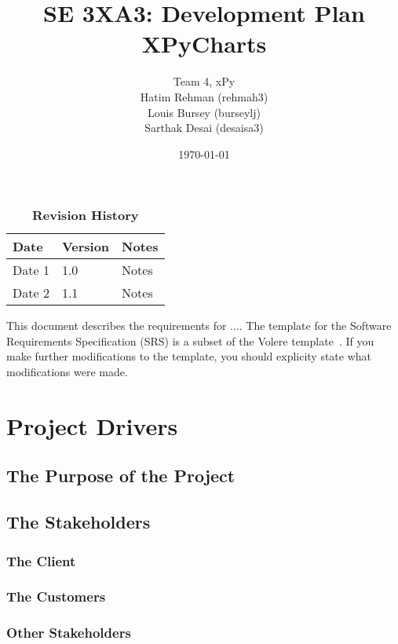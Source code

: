 \documentclass[12pt, titlepage]{article}
\title{SE 3XA3: Development Plan\\XPyCharts}
\author{Team 4, xPy
		\\ Hatim Rehman (rehmah3)
		\\ Louis Bursey (burseylj)
		\\ Sarthak Desai (desaisa3)
}
\date{\today}
\begin{document}
\maketitle

\tableofcontents
\listoftables
\listoffigures

\begin{table}[bp]
\caption{\bf Revision History}
\begin{tabularx}{\textwidth}{p{3cm}p{2cm}X}
\toprule {\bf Date} & {\bf Version} & {\bf Notes}\\
\midrule
Date 1 & 1.0 & Notes\\
Date 2 & 1.1 & Notes\\
\bottomrule
\end{tabularx}
\end{table}

\newpage


This document describes the requirements for ....  The template for the Software
Requirements Specification (SRS) is a subset of the Volere
template~\citep{RobertsonAndRobertson2012}.  If you make further modifications
to the template, you should explicity state what modifications were made.

\section{Project Drivers}

\subsection{The Purpose of the Project}

\subsection{The Stakeholders}

\subsubsection{The Client}

\subsubsection{The Customers}

\subsubsection{Other Stakeholders}
\end{document}
